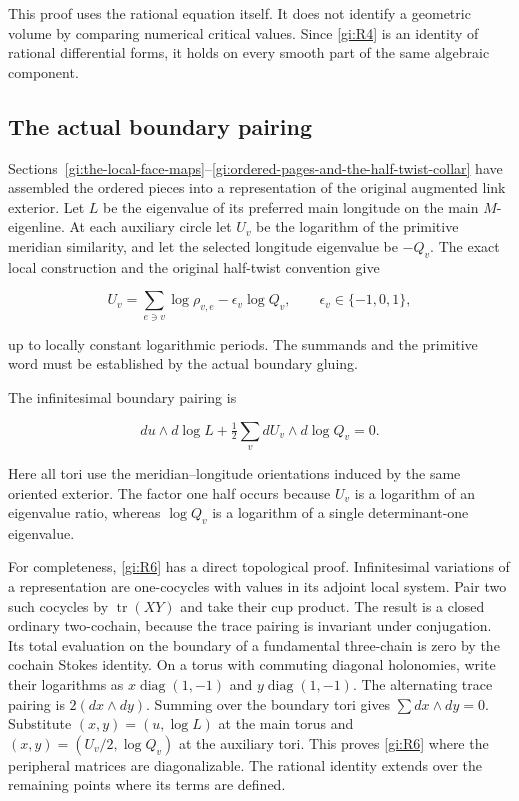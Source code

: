 This proof uses the rational equation itself. It does not identify a
geometric volume by comparing numerical critical values. Since \eqref{gi:R4} is
an identity of rational differential forms, it holds on every smooth
part of the same algebraic component.

\subsection{The actual boundary pairing}\label{gi:the-actual-boundary-pairing}

Sections~\ref{gi:the-local-face-maps}--\ref{gi:ordered-pages-and-the-half-twist-collar} have assembled the ordered pieces into a representation
of the original augmented link exterior. Let \(L\) be the
eigenvalue of its preferred main longitude on the main
\(M\)-eigenline. At each auxiliary circle let \(U_v\) be the
logarithm of the primitive meridian similarity, and let the selected
longitude eigenvalue be \(-Q_v\). The exact local construction and
the original half-twist convention give

\begin{equation}\label{gi:R5}
U_v=\sum_{e\ni v}\log\rho_{v,e}-\epsilon_v\log Q_v,
 \qquad \epsilon_v\in\{-1,0,1\},
\end{equation}

up to locally constant logarithmic periods. The summands and the
primitive word must be established by the actual boundary gluing.

The infinitesimal boundary pairing is

\begin{equation}\label{gi:R6}
du\wedge d\log L+
             \tfrac12\sum_v dU_v\wedge d\log Q_v=0.
\end{equation}

Here all tori use the meridian--longitude orientations induced by the
same oriented exterior. The factor one half occurs because \(U_v\)
is a logarithm of an eigenvalue ratio, whereas \(\log Q_v\) is
a logarithm of a single determinant-one eigenvalue.

For completeness, \eqref{gi:R6} has a direct topological proof. Infinitesimal
variations of a representation are one-cocycles with values in its
adjoint local system. Pair two such cocycles by
\(\operatorname{tr}(XY)\) and take their cup product. The result
is a closed ordinary two-cochain, because the trace pairing is
invariant under conjugation. Its total evaluation on the boundary
of a fundamental three-chain is zero by the cochain Stokes identity.
On a torus with commuting diagonal holonomies, write their logarithms
as \(x\operatorname{diag}(1,-1)\) and
\(y\operatorname{diag}(1,-1)\). The alternating trace pairing
is \(2(dx\wedge dy)\). Summing over the boundary tori gives
\(\sum dx\wedge dy=0\). Substitute
\((x,y)=(u,\log L)\) at the main torus and
\((x,y)=(U_v/2,\log Q_v)\) at the auxiliary tori. This proves
\eqref{gi:R6} where the peripheral matrices are diagonalizable. The rational
identity extends over the remaining points where its terms are defined.

